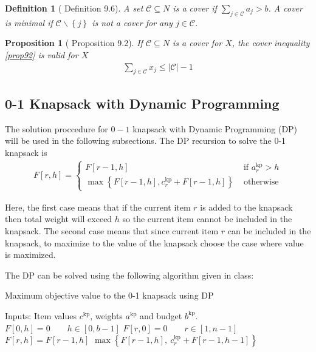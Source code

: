 \documentclass[10pt]{article}
\newtheorem{theorem}{Proposition}
\newtheorem{definition}{Definition}
\newcommand{\cbrace}[1]{\left\lbrace #1 \right\rbrace}
\newcommand{\C}{\mathcal{C}}
\begin{document}
    \begin{definition}[\cite{wolsey} Definition 9.6]
        A set $\C \subseteq N$ is a cover if $\sum_{j \in \C} a_j > b$. A cover is minimal if $\C \backslash \cbrace{j}$ is not a cover for any 
        $j \in \C$.
    \end{definition}

    \begin{theorem}[\cite{wolsey} Proposition 9.2]
        If $\C \subseteq N$ is a cover for $X$, the cover inequality \cref{prop92} is valid for $X$
        \begin{align}
            \sum\limits_{j \in \C} x_j \leq |\C| - 1 \label{prop92}
        \end{align}
    \end{theorem}

    \subsection{0-1 Knapsack with Dynamic Programming}
    The solution proccedure for $0-1$ knapsack with Dynamic Programming (DP) will be used in the following subsections. 
    The DP recursion to solve the 0-1 knapsack is
    \begin{align}
        F[r, h] = \begin{cases}
            F[r-1, h] & \text{ if } a_r^{\mathrm{kp}} > h \\
            \max \cbrace{ F[r-1, h], c_r^{\mathrm{kp}} + F[r-1, h]} & \text{ otherwise}
        \end{cases}
    \end{align}

    Here, the first case means that if the current item $r$ is added to the knapsack then total weight will exceed $h$
    so the current item cannot be included in the knapsack. The second case means that since current item $r$ can be
    included in the knapsack, to maximize to the value of the knapsack choose the case where value is maximized.

    The DP can be solved using the following algorithm given in class:
    \begin{algorithm}
        \caption{Maximum objective value to the 0-1 knapsack using DP}
        \begin{algorithmic}[1]
            \State Inputs: Item values $c^{\mathrm{kp}}$, weights $a^{\mathrm{kp}}$ and budget $b^{\mathrm{kp}}$.
            \State $F[0, h] = 0     \qquad h \in [0, b-1]$
            \State $F[r, 0] = 0     \qquad r \in [1, n-1]$
                        \State $F[r, h] = F[r-1, h]$
                    \Else
                        \State $\max \cbrace{ F[r-1, h], ~c^{\mathrm{kp}}_r + F[r-1, h-1]}$
                    \EndIf
                \EndFor
            \EndFor
        \end{algorithmic} 
        \label{kpa}
    \end{algorithm}
\end{document}
